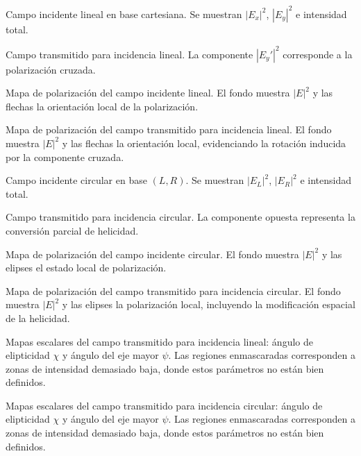 \caption{Campo incidente lineal en base cartesiana. Se muestran $|E_x|^2$, $|E_y|^2$ e intensidad total.}
\label{fig:lineal-incidente-componentes}

\caption{Campo transmitido para incidencia lineal. La componente $|E_y'|^2$ corresponde a la polarización cruzada.}
\label{fig:lineal-salida-componentes}

\caption{Mapa de polarización del campo incidente lineal. El fondo muestra $|E|^2$ y las flechas la orientación local de la polarización.}
\label{fig:lineal-incidente-mapa-polarizacion}

\caption{Mapa de polarización del campo transmitido para incidencia lineal. El fondo muestra $|E|^2$ y las flechas la orientación local, evidenciando la rotación inducida por la componente cruzada.}
\label{fig:lineal-salida-mapa-polarizacion}

\caption{Campo incidente circular en base $(L,R)$. Se muestran $|E_L|^2$, $|E_R|^2$ e intensidad total.}
\label{fig:circular-incidente-componentes}

\caption{Campo transmitido para incidencia circular. La componente opuesta representa la conversión parcial de helicidad.}
\label{fig:circular-salida-componentes}

\caption{Mapa de polarización del campo incidente circular. El fondo muestra $|E|^2$ y las elipses el estado local de polarización.}
\label{fig:circular-incidente-mapa-polarizacion}

\caption{Mapa de polarización del campo transmitido para incidencia circular. El fondo muestra $|E|^2$ y las elipses la polarización local, incluyendo la modificación espacial de la helicidad.}
\label{fig:circular-salida-mapa-polarizacion}

\caption{Mapas escalares del campo transmitido para incidencia lineal: ángulo de elipticidad $\chi$ y ángulo del eje mayor $\psi$. Las regiones enmascaradas corresponden a zonas de intensidad demasiado baja, donde estos parámetros no están bien definidos.}
\label{fig:lineal-salida-mapas-escalares}

\caption{Mapas escalares del campo transmitido para incidencia circular: ángulo de elipticidad $\chi$ y ángulo del eje mayor $\psi$. Las regiones enmascaradas corresponden a zonas de intensidad demasiado baja, donde estos parámetros no están bien definidos.}
\label{fig:circular-salida-mapas-escalares}

